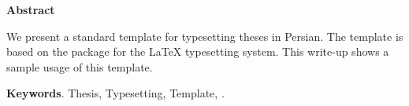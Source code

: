 
\begin{latin}
\begin{center}
\LARGE\textbf{Abstract}
\end{center}

We present a standard template for typesetting theses in Persian. The template is based on the \XePersian{} package for the \LaTeX{} typesetting system. This write-up shows a sample usage of this template.

\bigskip
\noindent
\textbf{Keywords}. Thesis, Typesetting, Template, \XePersian.
\end{latin}
